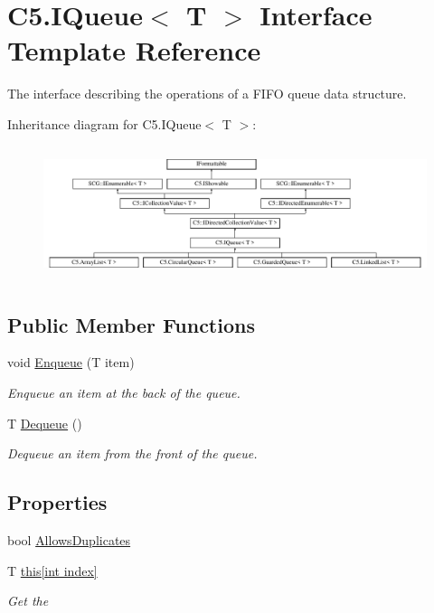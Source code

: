\hypertarget{interface_c5_1_1_i_queue}{}\section{C5.\+I\+Queue$<$ T $>$ Interface Template Reference}
\label{interface_c5_1_1_i_queue}


The interface describing the operations of a F\+I\+F\+O queue data structure.  


Inheritance diagram for C5.\+I\+Queue$<$ T $>$\+:\begin{figure}[H]
\begin{center}
\leavevmode
\includegraphics[height=3.943662cm]{interface_c5_1_1_i_queue}
\end{center}
\end{figure}
\subsection*{Public Member Functions}
\begin{DoxyCompactItemize}
\item 
void \hyperlink{interface_c5_1_1_i_queue_afceb820ca32b996f6fd5c34a85ccbacd}{Enqueue} (T item)
\begin{DoxyCompactList}\small\item\em Enqueue an item at the back of the queue. \end{DoxyCompactList}\item 
T \hyperlink{interface_c5_1_1_i_queue_ae64bb24d3237ad9cef4f55593ca20bc7}{Dequeue} ()
\begin{DoxyCompactList}\small\item\em Dequeue an item from the front of the queue. \end{DoxyCompactList}\end{DoxyCompactItemize}
\subsection*{Properties}
\begin{DoxyCompactItemize}
\item 
bool \hyperlink{interface_c5_1_1_i_queue_ab3c0251c21b3054813279abb3377d4f8}{Allows\+Duplicates}
\item 
T \hyperlink{interface_c5_1_1_i_queue_a750c0af1f1ec226a1729f841fcc1dfe9}{this\mbox{[}int index\mbox{]}}
\begin{DoxyCompactList}\small\item\em Get the \end{DoxyCompactList}\end{DoxyCompactItemize}
